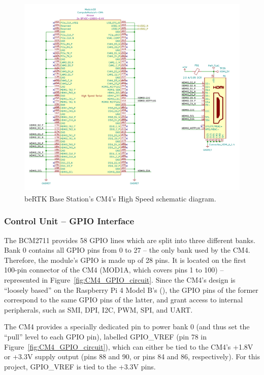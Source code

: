 \begin{figure}[h]
	\centering
	\includegraphics[width=1.0\textwidth]{Chapters/Figures/chapter3/CM4_HighSpeed.pdf}
	\caption{beRTK\textsuperscript{\textregistered} Base Station's CM4's High Speed schematic diagram.}
	\label{fig:CM4_HighSpeed_circuit}
\end{figure}


\subsubsection{Control Unit -- GPIO Interface}\label{sec:3222_CM4_GPIO}

The BCM2711 provides 58 GPIO lines which are split into three different banks. Bank 0 contains all GPIO pins from 0 to 27 -- the only bank used by the CM4. Therefore, the module's GPIO is made up of 28 pins. It is located on the first 100-pin connector of the CM4 (MOD1A, which covers pins 1 to 100) -- represented in Figure~\ref{fig:CM4_GPIO_circuit}. Since the CM4's design is ``loosely based'' on the Raspberry Pi 4 Model B's (\cite{CM4}), the GPIO pins of the former correspond to the same GPIO pins of the latter, and grant access to internal peripherals, such as SMI, DPI, I2C, PWM, SPI, and UART.

The CM4 provides a specially dedicated pin to power bank 0 (and thus set the ``pull'' level to each GPIO pin), labelled GPIO\_VREF (pin 78 in Figure~\ref{fig:CM4_GPIO_circuit}), which can either be tied to the CM4's +1.8V or +3.3V supply output (pins 88 and 90, or pins 84 and 86, respectively). For this project, GPIO\_VREF is tied to the +3.3V pins.

